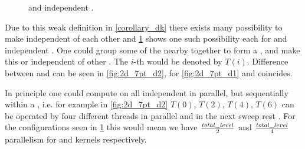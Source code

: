  \begin{figure}[tbhp]
 	\centering
 	\hspace{2.5em}
 	\caption{\DONE and \DTWO independent \levelGroups.}
 	\label{fig:2d-7pt_d1_d2}
 \end{figure}
 
  Due to this weak definition in \cref{corollary_dk} there exists many possibility to make \levels independent of each other and \cref{fig:2d-7pt_d1_d2} shows one such possibility each for \DONE and \DTWO independent \levels. One could group some of the nearby \levels together to form a \levelGroup, and make this \DONE or \DTWO independent of other \levelGroups. The $i$-th \levelGroup would be denoted by $T(i)$. Difference between \level and  \levelGroup can be seen in \cref{fig:2d_7pt_d2}, for \cref{fig:2d_7pt_d1} \levelGroup and \level coincides.
  
  In principle one could compute on all independent \levelGroups in parallel, but sequentially within a \levelGroup, i.e. for example in \cref{fig:2d_7pt_d2} $T(0)$, $T(2)$, $T(4)$, $T(6)$ can be operated by four different threads in parallel and in the next sweep rest \levelGroups. For the configurations seen in \cref{fig:2d-7pt_d1_d2} this would mean we have $\frac{total\_level}{2}$ and $\frac{total\_level}{4}$ parallelism for \DONE and \DTWO kernels respectively.
  

